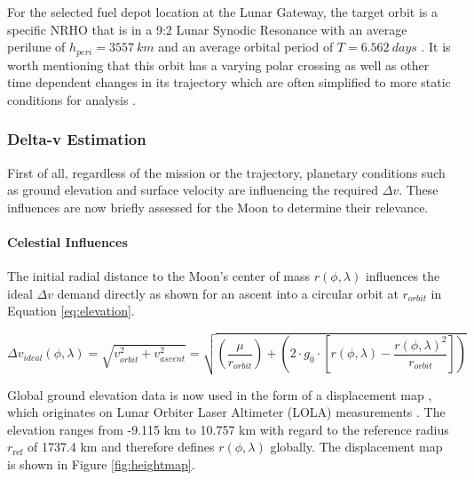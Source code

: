 \documentclass[utf8]{FrontiersinHarvard} %
\begin{document}
For the selected fuel depot location at the Lunar Gateway, the target orbit is a specific NRHO that is in a 9:2 Lunar Synodic Resonance with an average perilune of $h_{peri}= 3557 \ km$ and an average orbital period of $T= 6.562 \ days$ \citep{2019NationalAA}. It is worth mentioning that this orbit has a varying polar crossing as well as other time dependent changes in its trajectory which are often simplified to more static conditions for analysis \citep{Whitley.2018}.

\subsubsection{Delta-v Estimation}
\label{sec:dv-est}
First of all, regardless of the mission or the trajectory, planetary conditions such as ground elevation and surface velocity are influencing the required $\Delta v$.
These influences are now briefly assessed for the Moon to determine their relevance.

\paragraph{Celestial Influences}
\label{chap:planetary_influences}

The initial radial distance to the Moon's center of mass $r(\phi, \lambda)$ influences the ideal $\Delta v$ demand directly as shown for an ascent into a circular orbit at $r_{orbit}$ in Equation \ref{eq:elevation}.

\begin{equation}
\displaystyle \Delta v_{ideal}(\phi,\lambda) = \sqrt{v_{orbit}^2 + v_{ascent}^2} = \sqrt{ \left ( \frac{\mu}{r_{orbit}} \right ) +   \left ( 2 \cdot g_0 \cdot \left [ r(\phi, \lambda) - \frac{r(\phi, \lambda)^2}{r_{orbit}} \right ] \right )  }
\label{eq:elevation}
\end{equation}

Global ground elevation data is now used in the form of a displacement map \citep{nasaSVSMoon}, which originates on Lunar Orbiter Laser Altimeter (LOLA) measurements \citep{LRO.2015}.
The elevation ranges from -9.115 km to 10.757 km with regard to the reference radius $r_{\mathrm{ref}}$ of 1737.4 km and therefore defines $r(\phi,\lambda)$ globally.
The displacement map is shown in Figure \ref{fig:heightmap}.
\end{document}
